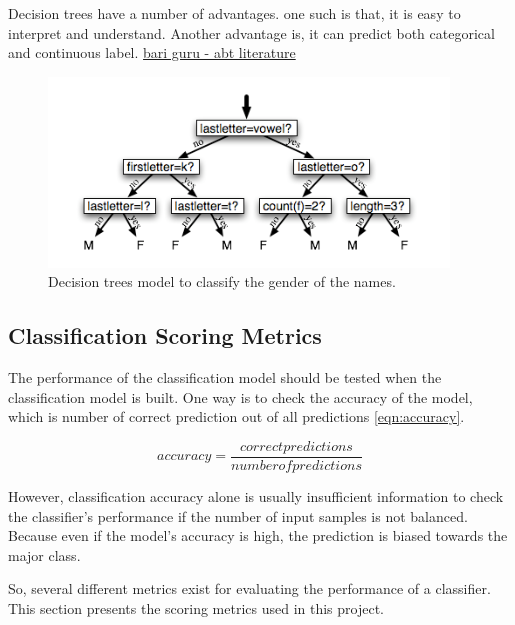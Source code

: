 Decision trees have a number of advantages. one such is that, it is easy to interpret and understand. Another advantage is, it can predict both categorical and continuous label. \underline{bari guru - abt literature }



\begin{figure}
	\centering
	\includegraphics[width=0.5\linewidth]{images/Decisiontrees.png}
	\caption{Decision trees model to classify the gender of the names.}
	\label{fig:Decision_tree}
\end{figure}

\subsection{Classification Scoring Metrics}

The performance of the classification model should be tested when the classification model is built. One way is to check the accuracy of the model, which is number of correct prediction out of all predictions \ref{eqn:accuracy}. 


\begin{equation}
\label{eqn:accuracy}
accuracy = \frac{correct predictions}{number of predictions}
\end{equation}

However, classification accuracy alone is usually insufficient information to check the classifier's performance if the number of input samples is not balanced. Because even if the model's accuracy is high, the prediction is biased towards the major class. 

So, several different metrics exist for evaluating the performance of a classifier. This section presents the scoring metrics used in this project.

